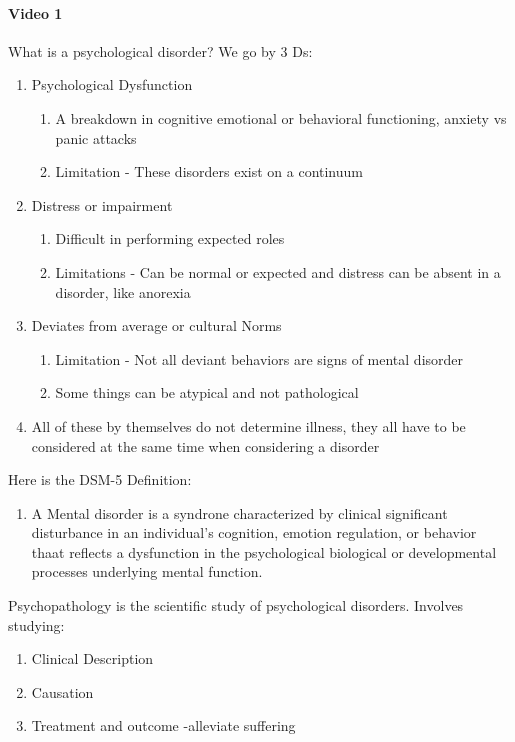 \documentclass[12pt]{article}
\begin{document}
\paragraph{Video 1}
What is a psychological disorder? We go by 3 Ds:
\begin{enumerate}
\item Psychological Dysfunction
  \begin{enumerate}
  \item A breakdown in cognitive emotional or behavioral functioning,
    anxiety vs panic attacks
  \item Limitation - These disorders exist on a continuum
  \end{enumerate}
\item Distress or impairment
  \begin{enumerate}
  \item Difficult in performing expected roles
  \item Limitations - Can be normal or expected and distress can be
    absent in a disorder, like anorexia
  \end{enumerate}
\item Deviates from average or cultural Norms
  \begin{enumerate}
  \item Limitation - Not all deviant behaviors are signs of mental
    disorder
  \item Some things can be atypical and not pathological
  \end{enumerate}
\item All of these by themselves do not determine illness, they all
  have to be considered at the same time when considering a disorder
\end{enumerate}
Here is the DSM-5 Definition:
\begin{enumerate}
\item A Mental disorder is a syndrone characterized by clinical
  significant disturbance in an individual's cognition, emotion
  regulation, or behavior thaat reflects a dysfunction in the
  psychological biological or developmental processes underlying
  mental function. 
\end{enumerate}
Psychopathology is the scientific study of psychological
disorders. Involves studying:
\begin{enumerate}
\item Clinical Description
\item Causation
\item Treatment and outcome -alleviate suffering
\end{enumerate}
\end{document}
